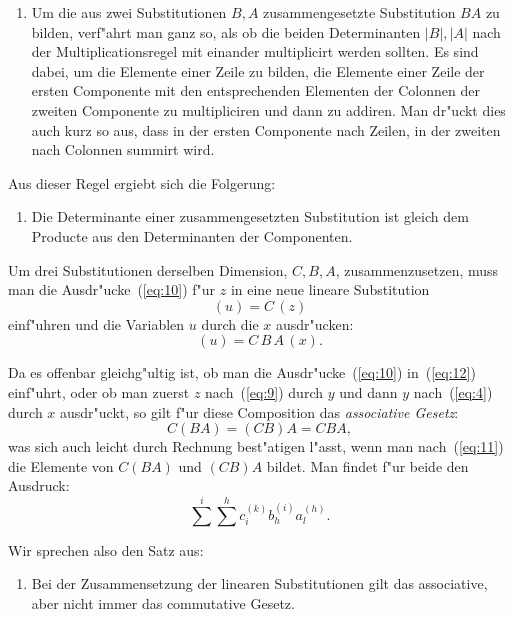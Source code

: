 \documentclass[12pt,a4paper]{article}
\theoremstyle{weber}
\begin{document}
\begin{enumerate}[label=\arabic*.]
\item Um die aus zwei Substitutionen $B, A$ zusammengesetzte Substitution $BA$ zu bilden, verf"ahrt man ganz so, als ob die beiden Determinanten $|B|, |A|$ nach der Multiplicationsregel mit einander multiplicirt werden sollten. Es sind dabei, um die Elemente einer Zeile zu bilden, die Elemente einer Zeile der ersten Componente mit den entsprechenden Elementen der Colonnen der zweiten Componente zu multipliciren und dann zu addiren. Man dr"uckt dies auch kurz so aus, dass in der ersten Componente nach Zeilen, in der zweiten nach Colonnen summirt wird.
\end{enumerate}

Aus dieser Regel ergiebt sich die Folgerung:

\begin{enumerate}[label=\arabic*., resume]
\item Die Determinante einer zusammengesetzten Substitution ist gleich dem Producte aus den Determinanten der Componenten.
\end{enumerate}


Um drei Substitutionen derselben Dimension, $C, B, A$, zusammenzusetzen, muss man die Ausdr"ucke~(\ref{eq:10}) f"ur $z$ in eine neue lineare Substitution
\begin{equation}\label{eq:12}
(u) = C\,(z)
\end{equation}
einf"uhren und die Variablen $u$ durch die $x$ ausdr"ucken:
\begin{equation}\label{eq:13}
(u) = C\,B\,A\,(x).
\end{equation}

Da es offenbar gleichg"ultig ist, ob man die Ausdr"ucke~(\ref{eq:10}) in~(\ref{eq:12}) einf"uhrt, oder ob man zuerst $z$ nach~(\ref{eq:9}) durch $y$ und dann $y$ nach~(\ref{eq:4}) durch $x$ ausdr"uckt, so gilt f"ur diese Composition das \textit{associative Gesetz}:
\begin{equation}\label{eq:14}
C(BA) = (CB)A = CBA,
\end{equation}
was sich auch leicht durch Rechnung best"atigen l"asst, wenn man nach~(\ref{eq:11}) die Elemente von $C(BA)$ und $(CB)A$ bildet. Man findet f"ur beide den Ausdruck:
\[
\sum^{i} \sum^{h} c_i^{(k)} b_h^{(i)} a_l^{(h)}.
\]

Wir sprechen also den Satz aus:

\begin{enumerate}[label=\arabic*., resume]
\item Bei der Zusammensetzung der linearen Substitutionen gilt das associative, aber nicht immer das commutative Gesetz.
\end{enumerate}
\end{document}
